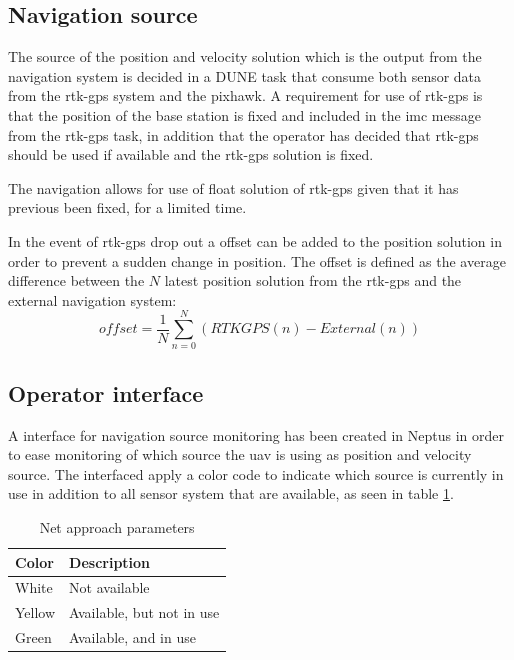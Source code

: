 \subsection{Navigation source}
The source of the position and velocity solution which is the output from the navigation system is decided in a DUNE task that consume both sensor data from the \gls{rtk-gps} system and the pixhawk. A requirement for use of \gls{rtk-gps} is that the position of the base station is fixed and included in the \gls{imc} message from the \gls{rtk-gps} task, in addition that the operator has decided that \gls{rtk-gps} should be used if available and the \gls{rtk-gps} solution is fixed.

The navigation allows for use of float solution of \gls{rtk-gps} given that it has previous been fixed, for a limited time.

In the event of \gls{rtk-gps} drop out a offset can be added to the position solution in order to prevent a sudden change in position. The offset is defined as the average difference between the $N$ latest position solution from the \gls{rtk-gps} and the external navigation system:
\begin{equation}
offset = \frac{1}{N}\sum_{n=0}^N(RTKGPS(n)-External(n))
\end{equation}
\subsection{Operator interface}
A interface for navigation source monitoring has been created in Neptus in order to ease monitoring of which source the \gls{uav} is using as position and velocity source. The interfaced apply a color code to indicate which source is currently in use in addition to all sensor system that are available, as seen in table \ref{Tb:Color Code}.

\begin{table}[H]
\begin{center}
    \begin{tabular}{ | l | l |}
    \hline
    \textbf{Color} & \textbf{Description} \\ \hline
    White & Not available \\ \hline
    Yellow & Available, but not in use \\ \hline
    Green & Available, and in use \\ \hline
    \end{tabular}
\end{center}
\caption{Net approach parameters }
\label{Tb:Color Code}
\end{table}

